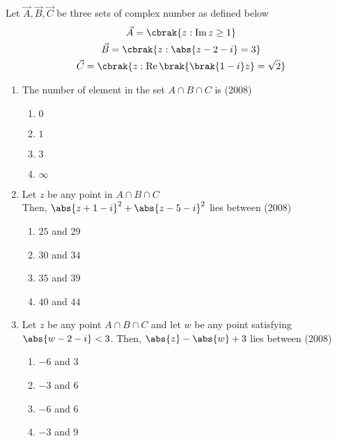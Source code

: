 \iffalse
	\title{Assignment}
	\author{Shreyansh Sonkar - ai24btech11032}
	\section{paragraph}
\fi
\item Let $ \vec{A}, \vec{B}, \vec{C}$ be three sets of complex number as defined below
\begin{gather*}
        \vec{A} = \cbrak{ z :\operatorname{Im}z\geq1}\\
        \vec{B}=\cbrak{z:\abs{z-2-i}=3}\\
        \vec{C}=\cbrak{ z : \operatorname{Re} \brak{\brak{1-i}z} = \sqrt{2}}
\end{gather*}
\begin{enumerate}
    \item The number of element in the set $A \cap {B} \cap {C}$ is
        \hfill (2008)

		\begin{multicols}{4}
			\begin{enumerate}
				\item $0$ 
				\item $1$
				\item $3$
				\item $\infty$
			\end{enumerate}
		\end{multicols}

    \item Let $z$ be any point in $A\cap{B}\cap{C}$ \\ Then, $\abs{z+1-i}^{2}+\abs{z-5-i}^{2}$ lies between
        \hfill (2008)

		\begin{multicols}{2}
			\begin{enumerate}
				\item $25$  and  $29$ 
				\item $30$ and $34$
				\item $35$ and $39$
				\item $40$ and $44$
			\end{enumerate}
		\end{multicols}
  
    \item Let $z$ be any point $A\cap{B}\cap{C}$ and let $w$ be any point satisfying $\abs{w-2-i}<3$. Then, $\abs{z}-\abs{w}+3$ lies between
        \hfill (2008)

		\begin{multicols}{2}
			\begin{enumerate}
				\item $-6$  and  $3$ 
				\item $-3$ and $6$
				\item $-6$ and $6$
				\item $-3$ and $9$
			\end{enumerate}
		\end{multicols}
  
\end{enumerate}
